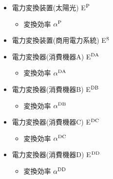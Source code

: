 \begin{itemize}
\begin{itemize}
  			\item[\IC] 蓄電池の充電量(変換後) $x^{\rm FC2}_{k}$
			\item[\IC] 蓄電池の放電量(変換前) $x^{\rm FD1}_{k}$
			\item[\IC] 蓄電池の放電量(変換後) $x^{\rm FD2}_{k}$
			 \item[\IB] 単位時間あたりの最大充電電量 $a^{\rm FC}$
  			\item[\IB] 単位時間あたりの最大放電量 $a^{\rm FD}$
  		\end{itemize}
 	\item[\IS] 電力変換装置(太陽光) E$^{\rm P}$
  		\begin{itemize}
   			\item[\IB] 変換効率 $\alpha^{\rm P}$
  		\end{itemize}
 	\item[\IS] 電力変換装置(商用電力系統) E$^{\rm S}$
 	\item[\IS] 電力変換器(消費機器A) E$^{\rm DA}$
  		\begin{itemize}
   			\item[\IB] 変換効率 $\alpha^{\rm DA}$
 		\end{itemize}
 	\item[\IS] 電力変換器(消費機器B) E$^{\rm DB}$
  		\begin{itemize}
  	 		\item[\IB] 変換効率 $\alpha^{\rm DB}$
 	 	\end{itemize}
 	\item[\IS] 電力変換器(消費機器C) E$^{\rm DC}$
	  	\begin{itemize}
	   		\item[\IB] 変換効率 $\alpha^{\rm DC}$
	 	 \end{itemize}
  	\item[\IS] 電力変換器(消費機器D) E$^{\rm DD}$
  	\begin{itemize}
   		\item[\IB] 変換効率 $\alpha^{\rm DD}$
  	\end{itemize} 
	

\end{itemize}
